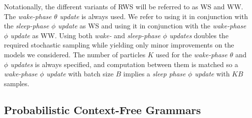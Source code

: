 %

Notationally, the different variants of \gls{RWS} will be referred to as \gls{WS} and \gls{WW}.
The \emph{wake-phase $\theta$ update} is always used.
We refer to using it in conjunction with the \emph{sleep-phase $\phi$ update} as \acrshort{WS} and using it in conjunction with the \emph{wake-phase $\phi$ update} as \acrshort{WW}.
Using both \emph{wake-} and \emph{sleep-phase $\phi$ updates} doubles the required stochastic sampling while yielding only minor improvements on the models we considered.
%
The number of particles $K$ used for the \emph{wake-phase $\theta$} and \emph{$\phi$ updates} is always specified, and computation between them is matched so
a \emph{wake-phase $\phi$ update} with batch size $B$ implies a \emph{sleep phase $\phi$ update} with $KB$ samples.

\subsection{Probabilistic Context-Free Grammars}
\label{sec:experiments/pcfg}

